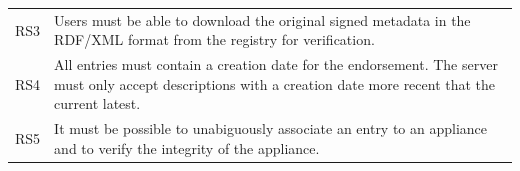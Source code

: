 \begin{table}
\begin{center}
\begin{tabular}{lp{}}
\\ RS3 & Users must be able to download the original signed metadata
in the RDF/XML format from the registry for verification.

\\ RS4 & All entries must contain a creation date for the endorsement.
The server must only accept descriptions with a creation date more
recent that the current latest.

\\ RS5 & It must be possible to unabiguously associate an entry to an
appliance and to verify the integrity of the appliance.

\\
\hline\hline
\end{tabular}
\end{center}
\end{table}
